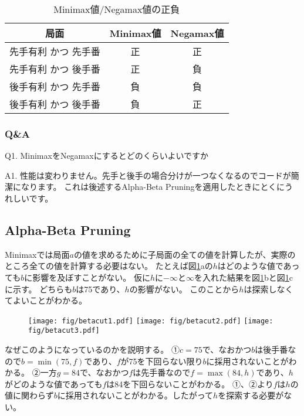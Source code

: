 \documentclass[11pt,a4paper]{ltjsarticle}
\begin{document}
\begin{table}[h]
  \caption{Minimax値/Negamax値の正負}
  \label{table1}
  \centering
  \begin{tabular}{ccc}
    局面                 & Minimax値 & Negamax値 \\
    \hline
    先手有利 かつ 先手番 & 正        & 正 \\
    先手有利 かつ 後手番 & 正        & 負 \\
    後手有利 かつ 先手番 & 負        & 負 \\
    後手有利 かつ 後手番 & 負        & 正 \\
  \end{tabular}
\end{table}


\subsubsection{Q\&A}

Q1. MinimaxをNegamaxにするとどのくらいよいですか

A1. 性能は変わりません。先手と後手の場合分けが一つなくなるのでコードが簡潔になります。
これは後述するAlpha-Beta Pruningを適用したときにとくにうれしいです。


\subsection{Alpha-Beta Pruning}

Minimaxでは局面$a$の値を求めるために子局面の全ての値を計算したが、実際のところ全ての値を計算する必要はない。
たとえば図\ref{betacut}aの$h$はどのような値であっても$b$に影響を及ぼすことがない。
仮に$h$に$-\infty$と$\infty$を入れた結果を図\ref{betacut}bと図\ref{betacut}cに示す。
どちらも$b$は75であり、$h$の影響がない。
このことから$h$は探索しなくてよいことがわかる。

\begin{figure}[h]
  \centering
  {\texttt{[image: fig/betacut1.pdf]}}
  {\texttt{[image: fig/betacut2.pdf]}}
  {\texttt{[image: fig/betacut3.pdf]}}
  \caption{}
  \label{betacut}
\end{figure}

なぜこのようになっているのかを説明する。
①${c=75}$で、なおかつ$b$は後手番なので${b = \min(75, f)}$であり、$f$が75を下回らない限り$b$に採用されないことがわかる。
②一方${g=84}$で、なおかつ$f$は先手番なので${f = \max(84,h)}$であり、$h$がどのような値であっても$f$は84を下回らないことがわかる。
①、②より$f$は$h$の値に関わらず$b$に採用されないことがわかる。したがって$h$を探索する必要がない。
\end{document}
